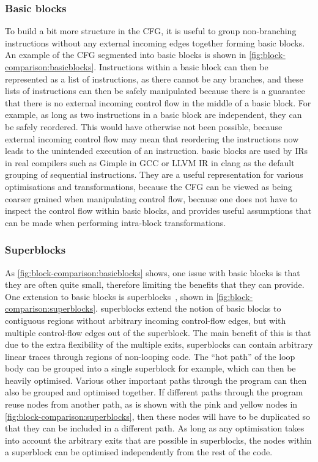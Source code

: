 \subsubsection{Basic blocks}

To build a bit more structure in the \gls{CFG}, it is useful to group
non-branching instructions without any external incoming edges together forming
\glspl{basic block}.  An example of the \gls{CFG} segmented into \glspl{basic
  block} is shown in \cref{fig:block-comparison:basicblocks}.  Instructions
within a \gls{basic block} can then be represented as a list of instructions, as
there cannot be any branches, and these lists of instructions can then be safely
manipulated because there is a guarantee that there is no external incoming
control flow in the middle of a \gls{basic block}.  For example, as long as two
instructions in a \gls{basic block} are independent, they can be safely
reordered.  This would have otherwise not been possible, because external incoming
control flow may mean that reordering the instructions now leads to the
unintended execution of an instruction.  \Glspl{basic block} are used by
\glspl{IR} in real compilers such as Gimple in GCC or LLVM IR in clang as the
default grouping of sequential instructions.  They are a useful representation
for various optimisations and transformations, because the \gls{CFG} can be
viewed as being coarser grained when manipulating control flow, because one does
not have to inspect the control flow within basic blocks, and provides useful
assumptions that can be made when performing intra-block transformations.

\subsubsection{Superblocks}

As \cref{fig:block-comparison:basicblocks} shows, one issue with \glspl{basic
  block} is that they are often quite small, therefore limiting the benefits
that they can provide. One extension to \glspl{basic block} is
\glspl{superblock}~\cite[]{hwu93_super}, shown in
\cref{fig:block-comparison:superblocks}.  \Glspl{superblock} extend the notion
of \glspl{basic block} to contiguous regions without arbitrary incoming
control-flow edges, but with multiple control-flow edges out of the
\gls{superblock}.  The main benefit of this is that due to the extra flexibility
of the multiple exits, \glspl{superblock} can contain arbitrary linear traces
through regions of non-looping code.  The \enquote{hot path} of the loop body
can be grouped into a single \gls{superblock} for example, which can then be
heavily optimised.  Various other important paths through the program can then
also be grouped and optimised together.  If different paths through the program
reuse nodes from another path, as is shown with the pink and yellow nodes in
\cref{fig:block-comparison:superblocks}, then these nodes will have to be
duplicated so that they can be included in a different path.  As long as any
optimisation takes into account the arbitrary exits that are possible in
\glspl{superblock}, the nodes within a \gls{superblock} can be optimised
independently from the rest of the code.


